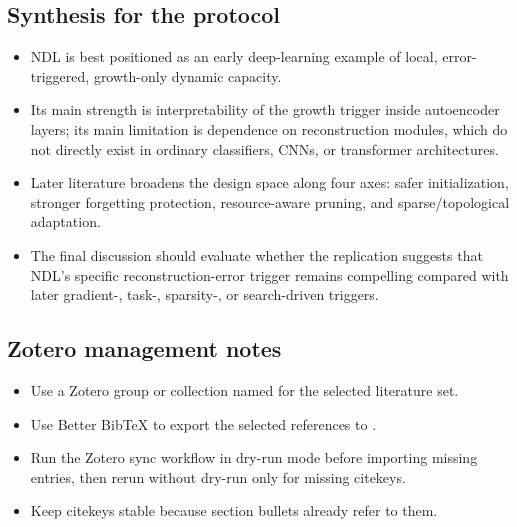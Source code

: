 \subsection{Synthesis for the protocol}
\begin{itemize}
  \item NDL is best positioned as an early deep-learning example of local, error-triggered, growth-only dynamic capacity.
  \item Its main strength is interpretability of the growth trigger inside autoencoder layers; its main limitation is dependence on reconstruction modules, which do not directly exist in ordinary classifiers, CNNs, or transformer architectures.
  \item Later literature broadens the design space along four axes: safer initialization, stronger forgetting protection, resource-aware pruning, and sparse/topological adaptation.
  \item The final discussion should evaluate whether the replication suggests that NDL's specific reconstruction-error trigger remains compelling compared with later gradient-, task-, sparsity-, or search-driven triggers.
\end{itemize}

\subsection{Zotero management notes}
\begin{itemize}
  \item Use a Zotero group or collection named  for the selected literature set.
  \item Use Better BibTeX to export the selected references to .
  \item Run the Zotero sync workflow in dry-run mode before importing missing entries, then rerun without dry-run only for missing citekeys.
  \item Keep citekeys stable because section bullets already refer to them.
\end{itemize}
